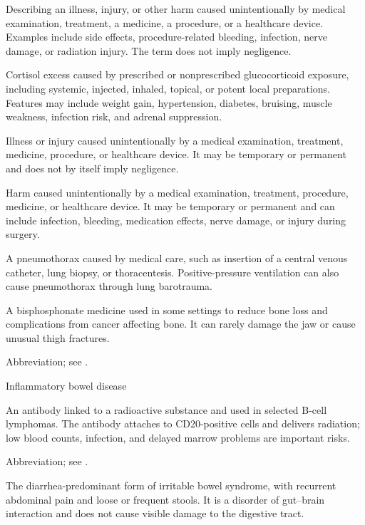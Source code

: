  Describing an illness, injury, or other harm caused unintentionally by medical examination, treatment, a medicine, a procedure, or a healthcare device. Examples include side effects, procedure-related bleeding, infection, nerve damage, or radiation injury. The term does not imply negligence.

 Cortisol excess caused by prescribed or nonprescribed glucocorticoid exposure, including systemic, injected, inhaled, topical, or potent local preparations. Features may include weight gain, hypertension, diabetes, bruising, muscle weakness, infection risk, and adrenal suppression.

 Illness or injury caused unintentionally by a medical examination, treatment, medicine, procedure, or healthcare device. It may be temporary or permanent and does not by itself imply negligence.

 Harm caused unintentionally by a medical examination, treatment, procedure, medicine, or healthcare device. It may be temporary or permanent and can include infection, bleeding, medication effects, nerve damage, or injury during surgery.

 A pneumothorax caused by medical care, such as insertion of a central venous catheter, lung biopsy, or thoracentesis. Positive-pressure ventilation can also cause pneumothorax through lung barotrauma.

 A bisphosphonate medicine used in some settings to reduce bone loss and complications from cancer affecting bone. It can rarely damage the jaw or cause unusual thigh fractures.

 Abbreviation; see .

\synonyms
Inflammatory bowel disease

 An antibody linked to a radioactive substance and used in selected B-cell lymphomas. The antibody attaches to CD20-positive cells and delivers radiation; low blood counts, infection, and delayed marrow problems are important risks.

 Abbreviation; see .

 The diarrhea-predominant form of irritable bowel syndrome, with recurrent abdominal pain and loose or frequent stools. It is a disorder of gut–brain interaction and does not cause visible damage to the digestive tract.

